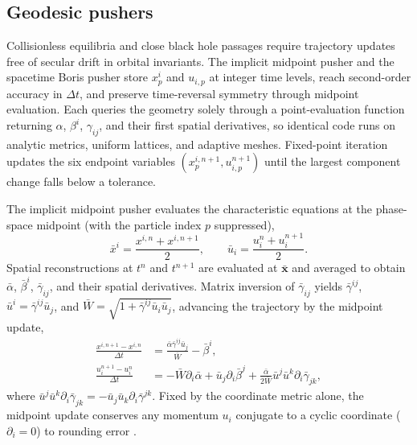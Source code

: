 \subsection{Geodesic pushers}\label{sec:pushers}

Collisionless equilibria and close black hole passages require trajectory updates free of secular drift in orbital invariants. The implicit midpoint pusher and the spacetime Boris pusher \cite{Wu:2026nrpic} store $x_p^i$ and $u_{i,p}$ at integer time levels, reach second-order accuracy in $\Delta t$, and preserve time-reversal symmetry through midpoint evaluation. Each queries the geometry solely through a point-evaluation function returning $\alpha$, $\beta^i$, $\gamma_{ij}$, and their first spatial derivatives, so identical code runs on analytic metrics, uniform lattices, and adaptive meshes. Fixed-point iteration updates the six endpoint variables $(x_p^{i,n+1}, u_{i,p}^{n+1})$ until the largest component change falls below a tolerance.

The implicit midpoint pusher evaluates the characteristic equations at the phase-space midpoint (with the particle index $p$ suppressed),
\begin{equation}\label{eq:midpoint_state}
\bar{x}^i = \frac{x^{i,n} + x^{i,n+1}}{2}, \qquad
\bar{u}_i = \frac{u_i^n + u_i^{n+1}}{2}.
\end{equation}
Spatial reconstructions at $t^n$ and $t^{n+1}$ are evaluated at $\bar{\bm{x}}$ and averaged to obtain $\bar{\alpha}$, $\bar{\beta}^i$, $\bar{\gamma}_{ij}$, and their spatial derivatives. Matrix inversion of $\bar{\gamma}_{ij}$ yields $\bar{\gamma}^{ij}$, $\bar{u}^i = \bar{\gamma}^{ij}\bar{u}_j$, and $\bar{W} = \sqrt{1 + \bar{\gamma}^{ij}\bar{u}_i\bar{u}_j}$, advancing the trajectory by the midpoint update,
\begin{align}\label{eq:midpoint_update}
\frac{x^{i,n+1} - x^{i,n}}{\Delta t} &= \frac{\bar{\alpha}\bar{\gamma}^{ij}\bar{u}_j}{\bar{W}} - \bar{\beta}^i, \nonumber\\
\frac{u_i^{n+1} - u_i^n}{\Delta t} &= -\bar{W}\partial_i\bar{\alpha} + \bar{u}_j\partial_i\bar{\beta}^j + \frac{\bar{\alpha}}{2\bar{W}}\bar{u}^j\bar{u}^k\partial_i\bar{\gamma}_{jk},
\end{align}
where $\bar{u}^j\bar{u}^k\partial_i\bar{\gamma}_{jk} = -\bar{u}_j\bar{u}_k\partial_i\bar{\gamma}^{jk}$. Fixed by the coordinate metric alone, the midpoint update conserves any momentum $u_i$ conjugate to a cyclic coordinate ($\partial_i = 0$) to rounding error \cite{Bacchini:2020cze}.

